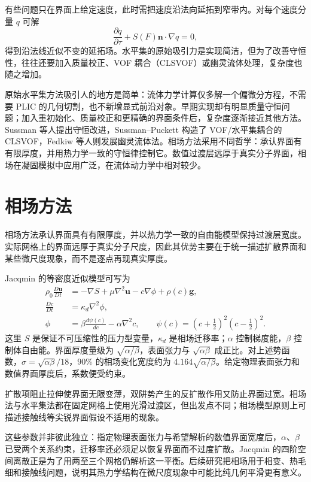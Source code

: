 \documentclass[11pt,a4paper,openany,fontset=none]{ctexbook}
\begin{document}
有些问题只在界面上给定速度，此时需把速度沿法向延拓到窄带内。对每个速度分量 $q$ 可解
\begin{equation}
\frac{\partial q}{\partial\tau}+S(F)\bm n\cdot\nabla q=0,
\tag{4.19}
\end{equation}
得到沿法线近似不变的延拓场。水平集的原始吸引力是实现简洁，但为了改善守恒性，往往还要加入质量校正、VOF 耦合（CLSVOF）或幽灵流体处理，复杂度也随之增加。

原始水平集方法吸引人的地方是简单：流体力学计算仅多解一个偏微分方程，不需要 PLIC 的几何切割，也不新增显式前沿对象。早期实现却有明显质量守恒问题；加入重初始化、质量校正和更精确的界面条件后，复杂度逐渐接近其他方法。Sussman 等人提出守恒改进，Sussman--Puckett 构造了 VOF/水平集耦合的 CLSVOF，Fedkiw 等人则发展幽灵流体法。相场方法采用不同哲学：承认界面有有限厚度，并用热力学一致的守恒律控制它。数值过渡层远厚于真实分子界面，相场在凝固模拟中应用广泛，在流体动力学中相对较少。

\section{相场方法}

相场方法承认界面具有有限厚度，并以热力学一致的自由能模型保持过渡层宽度。实际网格上的界面远厚于真实分子尺度，因此其优势主要在于统一描述扩散界面和某些微尺度现象，而不是逐点再现真实厚度。

Jacqmin 的等密度近似模型可写为
\begin{align}
\rho_0\frac{D\bm u}{Dt}&=-\nabla S+\mu\nabla^2\bm u-c\nabla\phi+\rho(c)\bm g,
\tag{4.20}\\
\frac{Dc}{Dt}&=\kappa_d\nabla^2\phi,
\tag{4.21}\\
\phi&=\beta\frac{d\psi(c)}{dc}-\alpha\nabla^2c,
\qquad \psi(c)=\left(c+\frac12\right)^2\left(c-\frac12\right)^2.
\tag{4.22}
\end{align}
这里 $S$ 是保证不可压缩性的压力型变量，$\kappa_d$ 是相场迁移率；$\alpha$ 控制梯度能，$\beta$ 控制体自由能。界面厚度量级为 $\sqrt{\alpha/\beta}$，表面张力与 $\sqrt{\alpha\beta}$ 成正比。对上述势函数，$\sigma=\sqrt{\alpha\beta}/18$，90\% 的相场变化宽度约为 $4.164\sqrt{\alpha/\beta}$。给定物理表面张力和数值界面厚度后，系数便受约束。

扩散项阻止拉伸使界面无限变薄，双阱势产生的反扩散作用又防止界面过宽。相场法与水平集法都在固定网格上使用光滑过渡区，但出发点不同；相场模型原则上可描述接触线等尖锐界面假设不适用的现象。

这些参数并非彼此独立：指定物理表面张力与希望解析的数值界面宽度后，$\alpha$、$\beta$ 已受两个关系约束，迁移率还必须足以恢复界面而不过度扩散。Jacqmin 的四阶空间离散正是为了用两至三个网格仍解析这一平衡。后续研究把相场用于相变、热毛细和接触线问题，说明其热力学结构在微尺度现象中可能比纯几何平滑更有意义。
\end{document}
